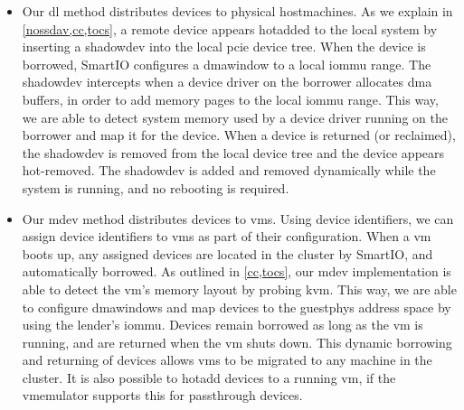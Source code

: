\begin{itemize}
    \item
        Our \gls{dl} method distributes devices to physical \glspl{hostmachine}.
        As we explain in \cref{nossdav,cc,tocs}, a remote device appears \gls{hotadded} to the local system by inserting a \gls{shadowdev} into the local \gls{pcie} device tree.
        When the device is borrowed, SmartIO configures a \gls{dmawindow} to a local \gls{iommu} range.
        The \gls{shadowdev} intercepts when a device driver on the \gls{borrower} allocates \gls{dma} buffers, in order to add memory pages to the local \gls{iommu} range.
        This way, we are able to detect system memory used by a device driver running on the \gls{borrower} and map it for the device.
        When a device is returned (or reclaimed), the \gls{shadowdev} is removed from the local device tree and the device appears hot-removed.
        The \gls{shadowdev} is added and removed dynamically while the system is running, and no rebooting is required.


    \item Our \gls{mdev} method distributes devices to \glspl{vm}.
        Using device identifiers, we can assign device identifiers to \glspl{vm} as part of their configuration.
        When a \gls{vm} boots up, any assigned devices are located in the cluster by SmartIO, and automatically borrowed. 
        As outlined in \cref{cc,tocs}, our \gls{mdev} implementation is able to detect the \gls{vm}'s memory layout by probing \gls{kvm}.
        This way, we are able to configure \glspl{dmawindow} and map devices to the \gls{guestphys} address space by using the \gls{lender}'s \gls{iommu}.
        Devices remain borrowed as long as the \gls{vm} is running, and are returned when the \gls{vm} shuts down.
        This dynamic borrowing and returning of devices allows \glspl{vm} to be migrated to any machine in the cluster.
        It is also possible to \gls{hotadd} devices to a running \gls{vm}, if the \gls{vmemulator} supports this for \gls{passthrough} devices.
        


\end{itemize}
